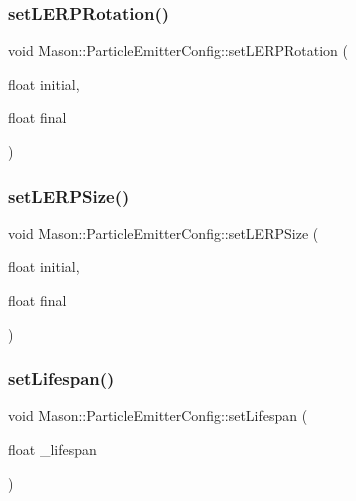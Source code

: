 \subsubsection{\texorpdfstring{set\+L\+E\+R\+P\+Rotation()}{setLERPRotation()}}
{\footnotesize\ttfamily void Mason\+::\+Particle\+Emitter\+Config\+::set\+L\+E\+R\+P\+Rotation (\begin{DoxyParamCaption}\item[{float}]{initial,  }\item[{float}]{final }\end{DoxyParamCaption})\hspace{0.3cm}{\ttfamily [inline]}}

\hypertarget{struct_mason_1_1_particle_emitter_config_a5495ec9be73c80df30115461b6af7733}{}\label{struct_mason_1_1_particle_emitter_config_a5495ec9be73c80df30115461b6af7733} 
\subsubsection{\texorpdfstring{set\+L\+E\+R\+P\+Size()}{setLERPSize()}}
{\footnotesize\ttfamily void Mason\+::\+Particle\+Emitter\+Config\+::set\+L\+E\+R\+P\+Size (\begin{DoxyParamCaption}\item[{float}]{initial,  }\item[{float}]{final }\end{DoxyParamCaption})\hspace{0.3cm}{\ttfamily [inline]}}

\hypertarget{struct_mason_1_1_particle_emitter_config_afe91ca5c2d60e5567fe589367b4fd3ef}{}\label{struct_mason_1_1_particle_emitter_config_afe91ca5c2d60e5567fe589367b4fd3ef} 
\subsubsection{\texorpdfstring{set\+Lifespan()}{setLifespan()}}
{\footnotesize\ttfamily void Mason\+::\+Particle\+Emitter\+Config\+::set\+Lifespan (\begin{DoxyParamCaption}\item[{float}]{\+\_\+lifespan }\end{DoxyParamCaption})\hspace{0.3cm}{\ttfamily [inline]}}

